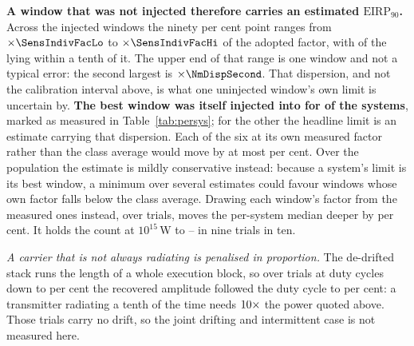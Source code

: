 \textbf{A window that was not injected therefore carries an estimated
$\mathrm{EIRP}_{90}$.} Across the injected windows the ninety per cent point
ranges from $\times\SensIndivFacLo$ to $\times\SensIndivFacHi$ of the
adopted factor, with \NmDispNTenth{} of the \SensNInj{} lying within a tenth
of it. The upper end of that range is one window and not a typical error: the
second largest is $\times\NmDispSecond$. That dispersion, and not the calibration
interval above, is what one uninjected window's own limit is uncertain by.
\textbf{The best window was itself injected into for \SmcNMeasSys{} of the
\NSysClassA{} systems}, marked as measured in Table~\ref{tab:persys}; for the
other \SmcNEstSys{} the headline limit is an estimate carrying that
dispersion. Each of the six at its own measured
factor rather than the class average would move by at most \NmOwnDevPct{} per
cent. Over the population the estimate is mildly conservative instead:
because a system's limit is its best window, a minimum over several estimates
could favour windows whose own factor falls below the class average. Drawing each window's factor from the \SensNInj{} measured ones instead,
over \ScRsNTrial{} trials, moves the per-system median deeper by
\ScRsMedShiftPct{} per cent. It holds the count at $10^{15}$\,W to
\ScRsNLo--\ScRsNHi{} in nine trials in ten.

\emph{A carrier that is not always radiating is penalised in proportion.} The
de-drifted stack runs the length of a whole execution block, so over
\DutyNTrial{} trials at duty cycles down to \DutyCycleMinPct{} per cent the
recovered amplitude followed the duty cycle to \DutyAttenDevPct{} per cent: a
transmitter radiating a tenth of the time needs $10\times$ the power
quoted above. Those trials carry no drift, so the joint drifting and
intermittent case is not measured here.

\begin{table}
\centering
\scriptsize
\caption{What sets $\mathrm{EIRP}_{90}$, and in which direction. The
uncertainty on the calibration is an uncertainty on the class-average factor,
and so on any statistic formed over many windows; its flux term is
band-dependent, so the submillimetre windows carry the larger combined
figure. The spread between windows
is an observed dispersion and is the statement about one window's own limit;
the signed terms are biases, stated with their direction rather than folded
into an error bar, and the decorrelation term is measured in \SensDecorNBlk{}
of the \SensDecorNBlkTot{} blocks and not imputed to the rest.}
\label{tab:p90budget}
\setlength{\tabcolsep}{2pt}

\end{table}

